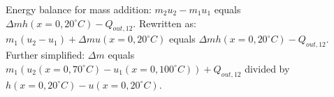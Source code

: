 Energy balance for mass addition:  
\( m_2 u_2 - m_1 u_1 \) equals \( \Delta m h(x = 0, 20^\circ C) - Q_{out,12} \).  
Rewritten as:  
\( m_1 (u_2 - u_1) + \Delta m u(x = 0, 20^\circ C) \) equals \( \Delta m h(x = 0, 20^\circ C) - Q_{out,12} \).  
Further simplified:  
\( \Delta m \) equals \( m_1 (u_2(x = 0, 70^\circ C) - u_1(x = 0, 100^\circ C)) + Q_{out,12} \) divided by \( h(x = 0, 20^\circ C) - u(x = 0, 20^\circ C) \).